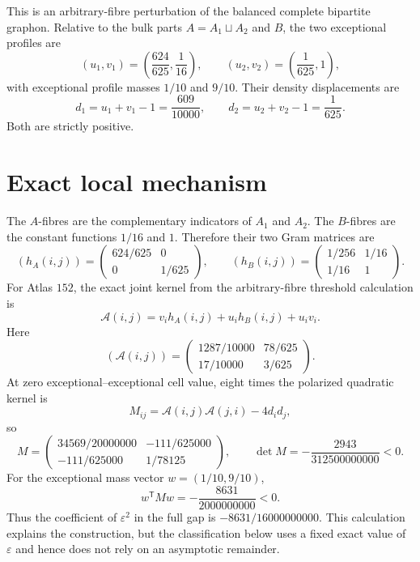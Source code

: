\documentclass[11pt]{article}
\begin{document}
This is an arbitrary-fibre perturbation of the balanced complete bipartite
graphon.  Relative to the bulk parts $A=A_1\sqcup A_2$ and $B$, the two
exceptional profiles are
\[
 (u_1,v_1)=\left(\frac{624}{625},\frac1{16}\right),
 \qquad
 (u_2,v_2)=\left(\frac1{625},1\right),
\]
with exceptional profile masses $1/10$ and $9/10$.  Their density
displacements are
\begin{equation}
 d_1=u_1+v_1-1=\frac{609}{10000},
 \qquad d_2=u_2+v_2-1=\frac1{625}.
 \label{eq:displacements}
\end{equation}
Both are strictly positive.

\section{Exact local mechanism}

The $A$-fibres are the complementary indicators of $A_1$ and $A_2$.
The $B$-fibres are the constant functions $1/16$ and $1$.  Therefore their
two Gram matrices are
\[
 (h_A(i,j))=
 \begin{pmatrix}624/625&0\\0&1/625\end{pmatrix},
 \qquad
 (h_B(i,j))=
 \begin{pmatrix}1/256&1/16\\1/16&1\end{pmatrix}.
\]
For Atlas $152$, the exact joint kernel from the arbitrary-fibre threshold
calculation is
\[
 \mathcal A(i,j)
 =v_i h_A(i,j)+u_i h_B(i,j)+u_iv_i.
\]
Here
\[
 (\mathcal A(i,j))=
 \begin{pmatrix}
 1287/10000&78/625\\[2pt]
 17/10000&3/625
 \end{pmatrix}.
\]
At zero exceptional--exceptional cell value, eight times the polarized
quadratic kernel is
\[
 M_{ij}=\mathcal A(i,j)\mathcal A(j,i)-4d_id_j,
\]
so
\begin{equation}
 M=
 \begin{pmatrix}
 34569/20000000&-111/625000\\[2pt]
 -111/625000&1/78125
 \end{pmatrix},
 \qquad
 \det M=-\frac{2943}{312500000000}<0.
 \label{eq:negative-kernel-matrix}
\end{equation}
For the exceptional mass vector $w=(1/10,9/10)$,
\begin{equation}
 w^{\mathsf T}Mw=-\frac{8631}{2000000000}<0.
 \label{eq:negative-quadratic}
\end{equation}
Thus the coefficient of $\varepsilon^2$ in the full gap is
$-8631/16000000000$.  This calculation explains the construction, but the
classification below uses a fixed exact value of $\varepsilon$ and hence
does not rely on an asymptotic remainder.
\end{document}

